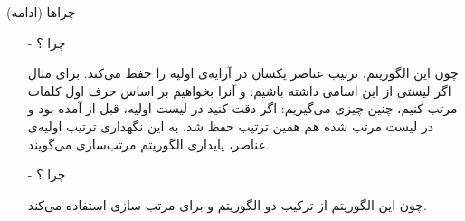 \begin{frame}{چراها (ادامه)}
\begin{itemize}\itemr
\item[-]
چرا ؟

چون این الگوریتم، ترتیب عناصر یکسان در آرایه‌ی اولیه را حفظ می‌کند. برای مثال اگر لیستی از این اسامی داشته باشیم: 
و آنرا بخواهیم بر اساس حرف اول کلمات مرتب کنیم، چنین چیزی می‌گیریم:
اگر دقت کنید در لیست اولیه،  قبل از  آمده بود و در لیست مرتب شده هم همین ترتیب حفظ شد. به این نگهداری ترتیب اولیه‌ی عناصر، پایداری الگوریتم مرتب‌سازی می‌گویند.

\item[-]
چرا ؟

چون این الگوریتم از ترکیب دو الگوریتم 
و
برای مرتب سازی استفاده می‌کند.
\end{itemize}
\end{frame}